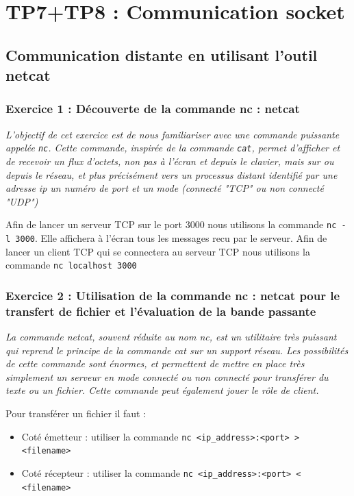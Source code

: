 \chapter{TP7+TP8 : Communication socket}

\section{Communication distante en utilisant l’outil netcat}

\subsection{Exercice 1 : Découverte de la commande nc : netcat}
\textit{L’objectif de cet exercice est de nous familiariser avec une commande puissante appelée \texttt{nc}. Cette commande, inspirée de la commande \texttt{cat}, permet d’afficher et de recevoir un flux d’octets, non pas à l’écran et depuis le clavier, mais sur ou depuis le réseau, et plus précisément vers un processus distant identifié par une adresse ip un numéro de port et un mode (connecté "TCP" ou non connecté "UDP")}

Afin de lancer un serveur TCP sur le port 3000 nous utilisons la commande \texttt{nc -l 3000}. Elle affichera à l'écran tous les messages recu par le serveur.
Afin de lancer un client TCP qui se connectera au serveur TCP nous utilisons la commande \texttt{nc localhost 3000}

\subsection{Exercice 2 : Utilisation de la commande nc : netcat pour le transfert de fichier et l’évaluation de la bande passante}
\textit{La commande netcat, souvent réduite au nom nc, est un utilitaire très puissant qui reprend le principe de la commande cat sur un support réseau. Les possibilités de cette commande sont énormes, et permettent de mettre en place très simplement un serveur en mode connecté ou non connecté pour transférer du texte ou un fichier. Cette commande peut également jouer le rôle de client.}

Pour transférer un fichier il faut :
\begin{itemize}
  \item Coté émetteur : utiliser la commande \texttt{nc <ip_address>:<port> > <filename>}
  \item Coté récepteur : utiliser la commande \texttt{nc <ip_address>:<port> < <filename>}
\end{itemize}

